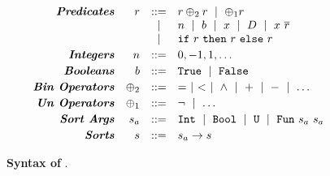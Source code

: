 \begin{figure}[t!]
\vspace{-5mm}
\centering
$$
\begin{array}{rrcl}
\emphbf{Predicates} 
  & \pred & ::= &
    \pred \binop \pred \spmid
    \unop \pred \\
  && \spmid & n \spmid b \spmid x \spmid \dc \spmid  x\ \overline{\pred}\\
  && \spmid & \eif{\pred}{\pred}{\pred}
\\[0.03in]

\emphbf{Integers} 
  & n
  & ::= & 0, -1, 1, \dots
\\[0.03in]

\emphbf{Booleans} 
  & b
  & ::= & \etrue \spmid \efalse
\\[0.03in]

\emphbf{Bin Operators} 
  & \binop
  & ::= & = \spmid < \spmid \land \spmid + \spmid - \spmid \dots
\\[0.03in]

\emphbf{Un Operators} 
  & \unop
  & ::= & \lnot \spmid \dots 
\\[0.03in]

\emphbf{Sort Args} 
  & \sort_a
  & ::= & \tint \spmid \tbool \spmid \tuniv 
         \spmid \tsmtfun{\sort_a}{\sort_a}
\\[0.03in]
\emphbf{Sorts} 
  & \sort
  & ::=  & \sort_a \rightarrow \sort
\end{array}
$$
\caption{\textbf{Syntax of \smtlan}.}
\label{fig:smtsyntax}
\vspace{-2mm}
\end{figure}
